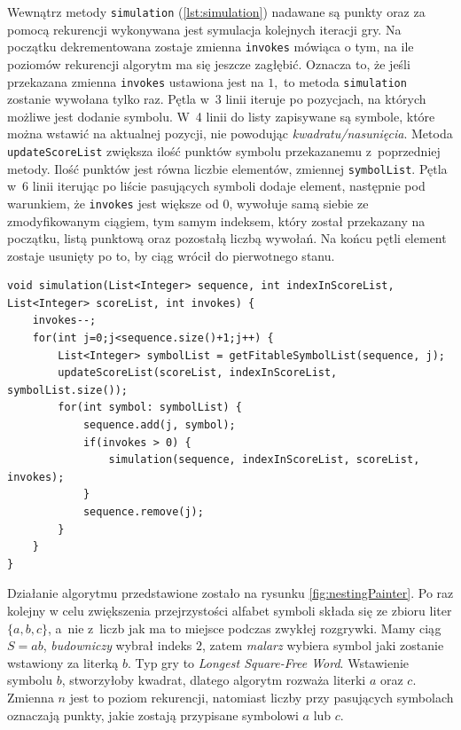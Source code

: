 \documentclass[document]{xmgr}
\begin{document}
Wewnątrz metody \texttt{simulation} (\ref{lst:simulation}) nadawane są punkty oraz za pomocą rekurencji wykonywana jest symulacja kolejnych iteracji gry. Na początku dekrementowana zostaje zmienna \texttt{invokes} mówiąca o tym, na ile poziomów rekurencji algorytm ma się jeszcze zagłębić. Oznacza to, że jeśli przekazana zmienna \texttt{invokes} ustawiona jest na $1$,~to metoda \texttt{simulation} zostanie wywołana tylko raz. Pętla w~3 linii iteruje po pozycjach, na których możliwe jest dodanie symbolu. W~4 linii do listy zapisywane są symbole, które można wstawić na aktualnej pozycji, nie powodując \emph{kwadratu/nasunięcia}. Metoda \texttt{updateScoreList} zwiększa ilość punktów symbolu przekazanemu z~poprzedniej metody. Ilość punktów jest równa liczbie elementów, zmiennej \texttt{symbolList}. Pętla w~6 linii iterując po liście pasujących symboli dodaje element, następnie pod warunkiem, że \mbox{\texttt{invokes}} jest większe od $0$, wywołuje samą siebie ze zmodyfikowanym ciągiem, tym samym indeksem, który został przekazany na początku, listą punktową oraz pozostałą liczbą wywołań. Na końcu pętli element zostaje usunięty po to, by ciąg wrócił do pierwotnego stanu.

\begin{lstlisting}[caption={Metoda rekurencyjnie wykonująca symulacje kolejnych ruchów.},label=lst:simulation]
void simulation(List<Integer> sequence, int indexInScoreList, List<Integer> scoreList, int invokes) {
	invokes--;
	for(int j=0;j<sequence.size()+1;j++) {
		List<Integer> symbolList = getFitableSymbolList(sequence, j);
		updateScoreList(scoreList, indexInScoreList, symbolList.size());
		for(int symbol: symbolList) {
			sequence.add(j, symbol);
			if(invokes > 0) {
				simulation(sequence, indexInScoreList, scoreList, invokes);
			}
			sequence.remove(j);
		}
	}
}
\end{lstlisting}

Działanie algorytmu przedstawione zostało na rysunku \ref{fig:nestingPainter}. Po raz kolejny w celu zwiększenia przejrzystości alfabet symboli składa się ze zbioru liter $\{a, b, c\}$, a~nie z~liczb jak ma to miejsce podczas zwykłej rozgrywki. Mamy ciąg $S = ab$, \emph{budowniczy} wybrał indeks $2$, zatem \emph{malarz} wybiera symbol jaki zostanie wstawiony za literką $b$. Typ gry to \emph{Longest Square-Free Word}. Wstawienie symbolu $b$, stworzyłoby kwadrat, dlatego algorytm rozważa literki $a$ oraz $c$. Zmienna $n$ jest to poziom rekurencji, natomiast liczby przy pasujących symbolach oznaczają punkty, jakie zostają przypisane symbolowi $a$ lub $c$. 
\end{document}
